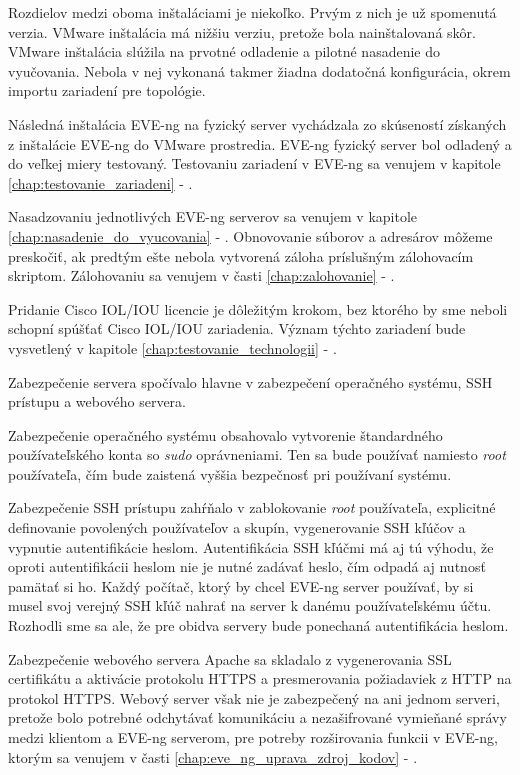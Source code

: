 Rozdielov medzi oboma inštaláciami je niekoľko. Prvým z nich je už spomenutá verzia. VMware inštalácia má nižšiu verziu, pretože bola nainštalovaná skôr. VMware inštalácia slúžila na prvotné odladenie a pilotné nasadenie do vyučovania. Nebola v nej vykonaná takmer žiadna dodatočná konfigurácia, okrem importu zariadení pre topológie.

Následná inštalácia EVE-ng na fyzický server vychádzala zo skúseností získaných z inštalácie EVE-ng do VMware prostredia. EVE-ng fyzický server bol odladený a do veľkej miery testovaný. Testovaniu zariadení v EVE-ng sa venujem v kapitole \ref{chap:testovanie_zariadeni} - .

Nasadzovaniu jednotlivých EVE-ng serverov sa venujem v kapitole \ref{chap:nasadenie_do_vyucovania} - . Obnovovanie súborov a adresárov môžeme preskočiť, ak predtým ešte nebola vytvorená záloha príslušným zálohovacím skriptom. Zálohovaniu sa venujem v časti \ref{chap:zalohovanie} - .

Pridanie Cisco IOL/IOU licencie je dôležitým krokom, bez ktorého by sme neboli schopní spúšťať Cisco IOL/IOU zariadenia. Význam týchto zariadení bude vysvetlený v kapitole \ref{chap:testovanie_technologii} - .

Zabezpečenie servera spočívalo hlavne v zabezpečení operačného systému, SSH prístupu a webového servera.

Zabezpečenie operačného systému obsahovalo vytvorenie štandardného používateľského konta so \emph{sudo} oprávneniami. Ten sa bude používať namiesto \emph{root} používateľa, čím bude zaistená vyššia bezpečnosť pri používaní systému.

Zabezpečenie SSH prístupu zahŕňalo v zablokovanie \emph{root} používateľa, explicitné definovanie povolených používateľov a skupín, vygenerovanie SSH kľúčov a vypnutie autentifikácie heslom. Autentifikácia SSH kľúčmi má aj tú výhodu, že oproti autentifikácii heslom nie je nutné zadávať heslo, čím odpadá aj nutnosť pamätať si ho. Každý počítač, ktorý by chcel EVE-ng server používať, by si musel svoj verejný SSH kľúč nahrať na server k danému používateľskému účtu. Rozhodli sme sa ale, že pre obidva servery bude ponechaná autentifikácia heslom.

Zabezpečenie webového servera Apache sa skladalo z vygenerovania SSL certifikátu a aktivácie protokolu HTTPS a presmerovania požiadaviek z HTTP na protokol HTTPS. Webový server však nie je zabezpečený na ani jednom serveri, pretože bolo potrebné odchytávať komunikáciu a nezašifrované vymieňané správy medzi klientom a EVE-ng serverom, pre potreby rozširovania funkcii v EVE-ng, ktorým sa venujem v časti \ref{chap:eve_ng_uprava_zdroj_kodov} - .

